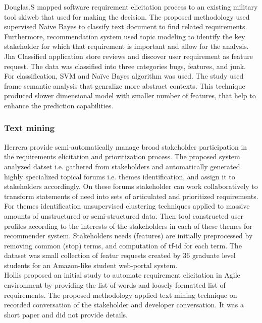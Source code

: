 	 Douglas.S \etal\cite{Douglas:S2008} mapped software requirement elicitation process to an
existing military tool skiweb that used for making the decision. The proposed
methodology used supervised Naive Bayes to classify text document to find
related requirements. Furthermore, recommendation system used topic modeling to
identify the key stakeholder for which that requirement is important and allow
for the analysis.\\

	 Jha \etal \cite{Jha:2017} Classified application store reviews
and discover user requirement as feature request. The data was classified into
three categories bugs, features, and junk. For classification, SVM and Naïve
Bayes algorithm was used. The study used frame semantic analysis that genralize
more abstract contexts. This technique produced slower dimensional model with
smaller number of features, that help to enhance the prediction
capabilities.\\


\subsubsection{Text mining}

 
 	Herrera \etal \cite{Castro-Herrera:2009} provide semi-automatically manage broad stakeholder participation in the requirements elicitation and prioritization process. 
The proposed system analyzed datset i.e. gathered from stakeholders and automatically generated highly specialized topical forums i.e. themes identification, and assign it to stakeholders accordingly.
On these forums stakeholder can work collaboratively to transform statements of need into sets of articulated and prioritized requirements. For themes identification unsupervised clustering
techniques applied to massive amounts of unstructured or semi-structured data. Then tool constructed user profiles according to the interests
of the stakeholders in each of these themes for recommender system. Stakeholders
needs (features) are initially preprocessed by removing common (stop) terms, and
computation of tf-id for each term. The dataset was  small collection of featur requests created by 36 graduate level students for an Amazon-like student web-portal system.\\

	Hollis \etal \cite{Hollis2017} proposed an initial study to automate requirement elicitation in Agile environment by providing the list of
words and loosely formatted list of requirements. The proposed methodology
applied text mining technique on recorded conversation of the stakeholder and
developer conversation. It was a short paper and did not provide details.\\

